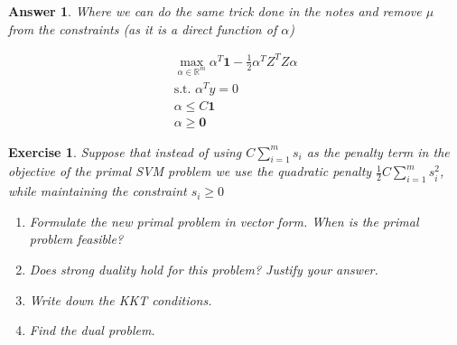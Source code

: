 \documentclass[12pt]{article}
\theoremstyle{colon}
\newtheorem{exercise}{Exercise}
\newtheorem*{answer}{Answer}
\begin{document}
\begin{answer}
  Where we can do the same trick done in the notes and remove $\mu$ from the constraints (as it is a direct function of $\alpha$)

  \begin{gather*}
    \max_{\alpha \in \mathbb{R}^m} \alpha^T \bm{1} -\frac{1}{2} \alpha^T Z^T Z \alpha \\
    \text{s.t. } \alpha^T y = 0 \\
    \alpha \leq C \bm{1} \\
    \alpha \geq \bm{0}
  \end{gather*}
\end{answer}

\clearpage

\begin{exercise}
  Suppose that instead of using $C \sum_{i=1}^m s_i$ as the penalty term in the objective of the primal SVM problem we use the quadratic penalty $\frac{1}{2} C \sum_{i=1}^m s_i^2$, while maintaining the constraint $s_i \geq 0$

  \begin{enumerate}[label=\alph*)]
    \item Formulate the new primal problem in vector form. When is the primal problem feasible?

    \item Does strong duality hold for this problem? Justify your answer.

    \item Write down the KKT conditions.

    \item Find the dual problem.
  \end{enumerate}
\end{exercise}
\end{document}
